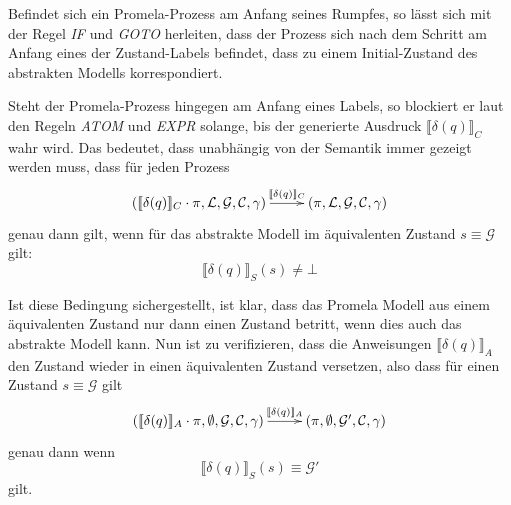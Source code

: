 Befindet sich ein Promela-Prozess am Anfang seines Rumpfes, so lässt sich mit der Regel \emph{IF} und \emph{GOTO} herleiten, dass der Prozess sich nach dem Schritt am Anfang eines der Zustand-Labels befindet, dass zu einem Initial-Zustand des abstrakten Modells korrespondiert.

Steht der Promela-Prozess hingegen am Anfang eines Labels, so blockiert er laut den Regeln \emph{ATOM} und \emph{EXPR} solange, bis der generierte Ausdruck $\llbracket \delta(q) \rrbracket_C$ wahr wird.
Das bedeutet, dass unabhängig von der Semantik immer gezeigt werden muss, dass für jeden Prozess 
\[ \xymatrix{ (\llbracket \delta(q)\rrbracket_C\cdot\pi,\mathcal{L},\mathcal{G},\mathcal{C},\gamma)\ar[r]^-{\llbracket \delta(q)\rrbracket_C} &
              (\pi,\mathcal{L},\mathcal{G},\mathcal{C},\gamma)
} \]
genau dann gilt, wenn für das abstrakte Modell im äquivalenten Zustand $s\equiv\mathcal{G}$ gilt:
\[ \llbracket \delta(q) \rrbracket_S(s) \neq \bot \]

Ist diese Bedingung sichergestellt, ist klar, dass das Promela Modell aus einem äquivalenten Zustand nur dann einen Zustand betritt, wenn dies auch das abstrakte Modell kann.
Nun ist zu verifizieren, dass die Anweisungen $\llbracket \delta(q)\rrbracket_A$ den Zustand wieder in einen äquivalenten Zustand versetzen, also dass für einen Zustand $s\equiv\mathcal{G}$ gilt
\[ \xymatrix{ (\llbracket \delta(q)\rrbracket_A\cdot\pi,\emptyset,\mathcal{G},\mathcal{C},\gamma)\ar[r]^-{\llbracket \delta(q)\rrbracket_A} &
              (\pi,\emptyset,\mathcal{G'},\mathcal{C},\gamma)
} \]
genau dann wenn
\[ \llbracket \delta(q)\rrbracket_S(s)\equiv\mathcal{G'} \]
gilt.